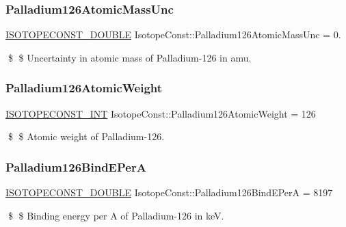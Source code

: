 \subsubsection{\texorpdfstring{Palladium126\+Atomic\+Mass\+Unc}{Palladium126AtomicMassUnc}}
{\footnotesize\ttfamily \mbox{\hyperlink{group___isotope_const-_macros_ga8f45a7272ce02c0b4c65c44636ed719a}{I\+S\+O\+T\+O\+P\+E\+C\+O\+N\+S\+T\+\_\+\+D\+O\+U\+B\+LE}} Isotope\+Const\+::\+Palladium126\+Atomic\+Mass\+Unc = 0.}

\$ \$ Uncertainty in atomic mass of Palladium-\/126 in amu. \mbox{\label{group___isotope_const-_palladium-_pd126_gac258cd32960a10910f1bc3c707bd92cd}} 
\subsubsection{\texorpdfstring{Palladium126\+Atomic\+Weight}{Palladium126AtomicWeight}}
{\footnotesize\ttfamily \mbox{\hyperlink{group___isotope_const-_macros_ga5f18360b3e99483a35c32d789e62621c}{I\+S\+O\+T\+O\+P\+E\+C\+O\+N\+S\+T\+\_\+\+I\+NT}} Isotope\+Const\+::\+Palladium126\+Atomic\+Weight = 126}

\$ \$ Atomic weight of Palladium-\/126. \mbox{\label{group___isotope_const-_palladium-_pd126_ga45dc2f7aecdfe85e549b7f56716e9914}} 
\subsubsection{\texorpdfstring{Palladium126\+Bind\+E\+PerA}{Palladium126BindEPerA}}
{\footnotesize\ttfamily \mbox{\hyperlink{group___isotope_const-_macros_ga8f45a7272ce02c0b4c65c44636ed719a}{I\+S\+O\+T\+O\+P\+E\+C\+O\+N\+S\+T\+\_\+\+D\+O\+U\+B\+LE}} Isotope\+Const\+::\+Palladium126\+Bind\+E\+PerA = 8197}

\$ \$ Binding energy per A of Palladium-\/126 in keV. \mbox{\label{group___isotope_const-_palladium-_pd126_gaebe564e3e94bf5ac00b9e06e07d1ae98}} 
